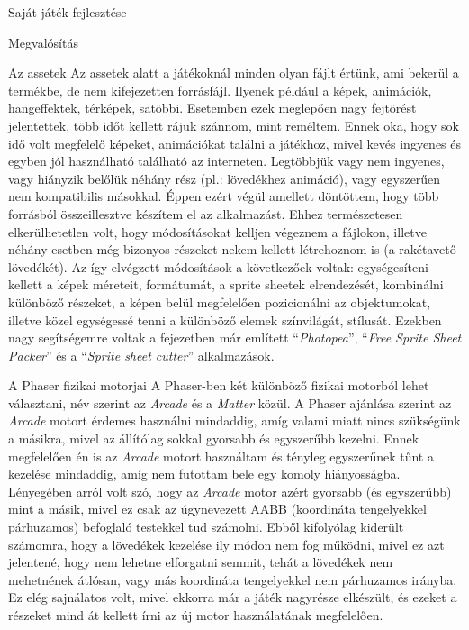\begin{MyChapter}{Saját játék fejlesztése}
\begin{MySection}{Megvalósítás}
		\begin{MySubSection}{Az assetek}
			Az assetek alatt a játékoknál minden olyan fájlt értünk, ami bekerül a termékbe, de nem kifejezetten forrásfájl. Ilyenek például a képek, animációk, hangeffektek, térképek, satöbbi. \cite{game_development_terms} Esetemben ezek meglepően nagy fejtörést jelentettek, több időt kellett rájuk szánnom, mint reméltem. Ennek oka, hogy sok idő volt megfelelő képeket, animációkat találni a játékhoz, mivel kevés ingyenes és egyben jól használható található az interneten. Legtöbbjük vagy nem ingyenes, vagy hiányzik belőlük néhány rész (pl.: lövedékhez animáció), vagy egyszerűen nem kompatibilis másokkal. Éppen ezért végül amellett döntöttem, hogy több forrásból összeillesztve készítem el az alkalmazást. Ehhez természetesen elkerülhetetlen volt, hogy módosításokat kelljen végeznem a fájlokon, illetve néhány esetben még bizonyos részeket nekem kellett létrehoznom is (a rakétavető lövedékét). Az így elvégzett módosítások a következőek voltak: egységesíteni kellett a képek méreteit, formátumát, a sprite sheetek elrendezését, kombinálni különböző részeket, a képen belül megfelelően pozicionálni az objektumokat, illetve közel egységessé tenni a különböző elemek színvilágát, stílusát. Ezekben nagy segítségemre voltak a  fejezetben már említett ``\textit{Photopea}'', ``\textit{Free Sprite Sheet Packer}'' és a ``\textit{Sprite sheet cutter}'' alkalmazások.
		\end{MySubSection}
		
		\begin{MySubSection}{A Phaser fizikai motorjai}
			A Phaser-ben két különböző fizikai motorból lehet választani, név szerint az \textit{Arcade} és a \textit{Matter} közül. A Phaser ajánlása szerint az \textit{Arcade} motort érdemes használni mindaddig, amíg valami miatt nincs szükségünk a másikra, mivel az állítólag sokkal gyorsabb és egyszerűbb kezelni. Ennek megfelelően én is az \textit{Arcade} motort használtam és tényleg egyszerűnek tűnt a kezelése mindaddig, amíg nem futottam bele egy komoly hiányosságba. Lényegében arról volt szó, hogy az \textit{Arcade} motor azért gyorsabb (és egyszerűbb) mint a másik, mivel ez csak az úgynevezett AABB (koordináta tengelyekkel párhuzamos) befoglaló testekkel tud számolni. Ebből kifolyólag kiderült számomra, hogy a lövedékek kezelése ily módon nem fog működni, mivel ez azt jelentené, hogy nem lehetne elforgatni semmit, tehát a lövedékek nem mehetnének átlósan, vagy más koordináta tengelyekkel nem párhuzamos irányba. Ez elég sajnálatos volt, mivel ekkorra már a játék nagyrésze elkészült, és ezeket a részeket mind át kellett írni az új motor használatának megfelelően.
			

\end{MySubSection}
\end{MySection}
\end{MyChapter}
